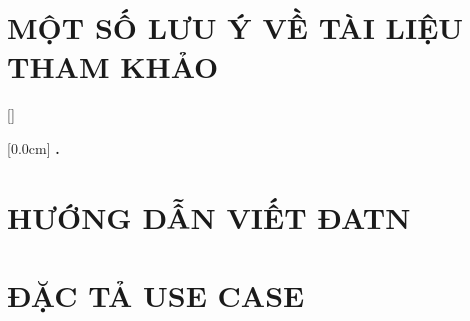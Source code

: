 \documentclass[a4paper,13pt,oneside]{report}
\renewcommand{\bibname}{Danh_sach_tai_lieu_tham_khao}
\theoremstyle{definition}
\begin{document}
\newpage
\chapter*{MỘT SỐ LƯU Ý VỀ TÀI LIỆU THAM KHẢO} %
\label{chapter:reference}


\newpage
\renewcommand\bibname{TÀI LIỆU THAM KHẢO}
\printbibliography
{}

\appendixpage
\appendix
\addappheadtotoc

[]
\titlespacing*{\chapter}{0pt}{-20pt}{20pt}

    [0.0cm]             %
    {\bfseries\vspace{0.3cm}}                  %
    {{\bfseries{\scshape} \thecontentslabel.\ }} %
    {}         %
    {\contentspage} 
    
\chapter{HƯỚNG DẪN VIẾT ĐATN}


\newpage
\chapter{ĐẶC TẢ USE CASE}

\end{document}
